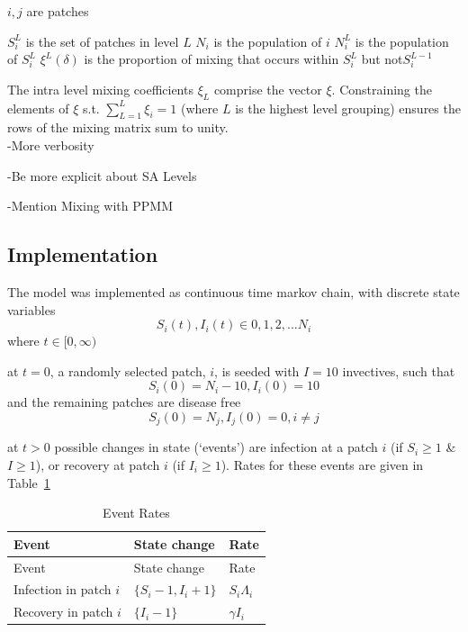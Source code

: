 \documentclass[
  letterpaper,
  DIV=11,
  numbers=noendperiod]{scrreprt}
\begin{document}
\(i, j\) are patches

\(S_{i}^{L}\) is the set of patches in level \(L\) \(N_i\) is the
population of \(i\) \(N_{i}^{L}\) is the population of \(S_{i}^{L}\)
\(\xi^{L}(\delta)\) is the proportion of mixing that occurs within
\(S_{i}^{L}\) but not\(S_{i}^{L-1}\)

The intra level mixing coefficients \(\xi_L\) comprise the vector
\(\xi\). Constraining the elements of \(\xi\) s.t.
\(\sum\limits_{L = 1}^{L} \xi_i = 1\) (where \(L\) is the highest level
grouping) ensures the rows of the mixing matrix sum to unity.\\

-More verbosity

-Be more explicit about SA Levels

-Mention Mixing with PPMM

\hypertarget{implementation}{%
\subsection{Implementation}\label{implementation}}

The model was implemented as continuous time markov chain, with discrete
state variables \[S_{i}(t), I_{i}(t) \in {0,1,2,...N_{i}}\] where
\(t\in [0, \infty)\)

at \(t = 0\), a randomly selected patch, \(i\), is seeded with
\(I = 10\) invectives, such that
\[S_{i}(0) = N_{i} - 10, I_{i}(0) = 10\] and the remaining patches are
disease free \[S_j(0) = N_j, I_j(0) =0, i\neq j \]

at \(t>0\) possible changes in state (`events') are infection at a patch
\(i\) (if \(S_i \geq 1\) \& \(I \geq 1\)), or recovery at patch \(i\)
(if \(I_i \geq 1\)). Rates for these events are given in
Table~\ref{tbl-EventRates}

\hypertarget{tbl-EventRates}{}
\begin{longtable}[]{@{}lll@{}}
\caption{\label{tbl-EventRates}Event Rates}\tabularnewline
\toprule\noalign{}
Event & State change & Rate \\
\midrule\noalign{}
\endfirsthead
\toprule\noalign{}
Event & State change & Rate \\
\midrule\noalign{}
\endhead
\bottomrule\noalign{}
\endlastfoot
Infection in patch \(i\) & \(\{S_i -1, I_i +1\}\) & \(S_i \Lambda_i\) \\
Recovery in patch \(i\) & \(\{I_i - 1\}\) & \(\gamma I_i\) \\
\end{longtable}
\end{document}
